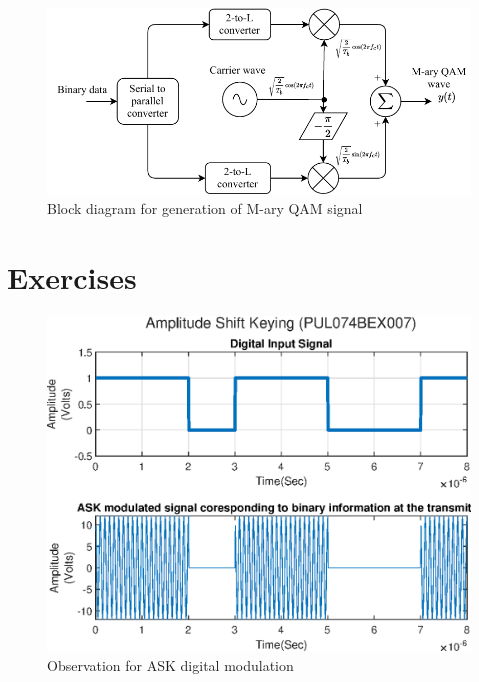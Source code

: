 \documentclass{lab_sheet}
\begin{document}
\begin{figure}[H]
    \centering
    \includegraphics{../Figures/qam_block}
    \caption{Block diagram for generation of M-ary QAM signal}
    \label{fig:qam_block}
\end{figure}
\section{Exercises}

\begin{figure}[H]
    \centering
    \includegraphics{../Figures/ask-obs}
    \caption{Observation for ASK digital modulation}
    \label{fig:ask-obs}
\end{figure}
\end{document}
